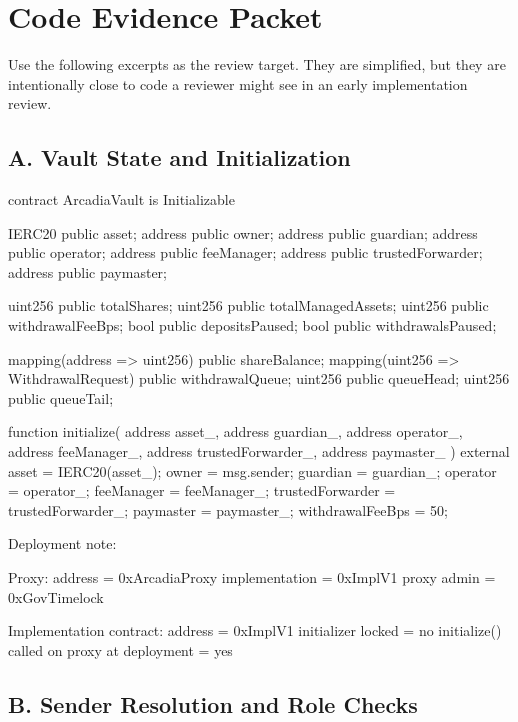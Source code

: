 \section*{Code Evidence Packet}

Use the following excerpts as the review target. They are simplified, but they are intentionally close to code a reviewer might see in an early implementation review.

\subsection*{A. Vault State and Initialization}

\begin{codeblock}
contract ArcadiaVault is Initializable {
    IERC20 public asset;
    address public owner;
    address public guardian;
    address public operator;
    address public feeManager;
    address public trustedForwarder;
    address public paymaster;

    uint256 public totalShares;
    uint256 public totalManagedAssets;
    uint256 public withdrawalFeeBps;
    bool public depositsPaused;
    bool public withdrawalsPaused;

    mapping(address => uint256) public shareBalance;
    mapping(uint256 => WithdrawalRequest) public withdrawalQueue;
    uint256 public queueHead;
    uint256 public queueTail;

    function initialize(
        address asset_,
        address guardian_,
        address operator_,
        address feeManager_,
        address trustedForwarder_,
        address paymaster_
    ) external {
        asset = IERC20(asset_);
        owner = msg.sender;
        guardian = guardian_;
        operator = operator_;
        feeManager = feeManager_;
        trustedForwarder = trustedForwarder_;
        paymaster = paymaster_;
        withdrawalFeeBps = 50;
    }
}
\end{codeblock}

Deployment note:

\begin{codeblock}
Proxy:
    address = 0xArcadiaProxy
    implementation = 0xImplV1
    proxy admin = 0xGovTimelock

Implementation contract:
    address = 0xImplV1
    initializer locked = no
    initialize() called on proxy at deployment = yes
\end{codeblock}

\subsection*{B. Sender Resolution and Role Checks}

